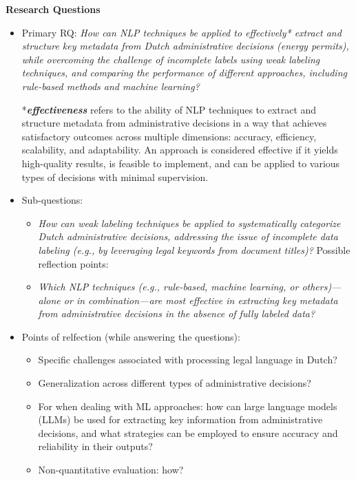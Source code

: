 \documentclass[11pt]{article}
\begin{document}
\textbf{Research Questions}
\begin{itemize}
\item Primary RQ:
\textit{How can NLP techniques be applied to effectively* extract and structure key metadata from Dutch administrative decisions (energy permits), while overcoming the challenge of incomplete labels using weak labeling techniques, and comparing the performance of different approaches, including rule-based methods and machine learning?}

*\textit{\textbf{effectiveness}} refers to the ability of NLP techniques to extract and structure metadata from administrative decisions in a way that achieves satisfactory outcomes across multiple dimensions: accuracy, efficiency, scalability, and adaptability. An approach is considered effective if it yields high-quality results, is feasible to implement, and can be applied to various types of decisions with minimal supervision.

\item Sub-questions:
    \begin{itemize}
        \item \textit{How can weak labeling techniques be applied to systematically categorize Dutch administrative decisions, addressing the issue of incomplete data labeling (e.g., by leveraging legal keywords from document titles)?}
        Possible reflection points:
        \item \textit{Which NLP techniques (e.g., rule-based, machine learning, or others)—alone or in combination—are most effective in extracting key metadata from administrative decisions in the absence of fully labeled data?}
    \end{itemize}
    \item Points of relfection (while answering the questions):
    \begin{itemize}
        \item Specific challenges associated with processing legal language in Dutch?
        \item Generalization across different types of administrative decisions?
        \item For when dealing with ML approaches:  how can large language models (LLMs) be used for extracting key information from administrative decisions, and what strategies can be employed to ensure accuracy and reliability in their outputs?
        \item Non-quantitative evaluation: how? 
    \end{itemize}
\end{itemize}
\end{document}
